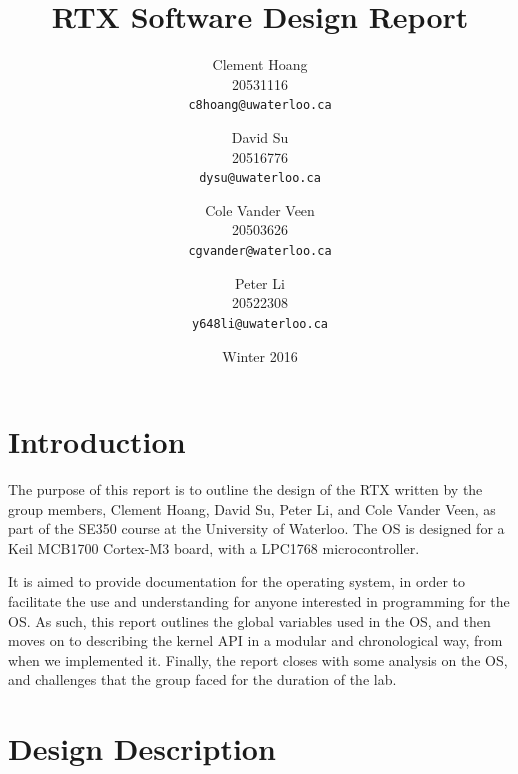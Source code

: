 \documentclass[12pt]{report}
\begin{document}
\title{RTX Software Design Report}

\author{
    Clement Hoang\\
		20531116\\
    \texttt{c8hoang@uwaterloo.ca}
    \and
    David Su\\
		20516776\\
    \texttt{dysu@uwaterloo.ca}
    \and
    Cole Vander Veen\\
		20503626\\
    \texttt{cgvander@waterloo.ca}
    \and
    Peter Li\\
		20522308\\
    \texttt{y648li@uwaterloo.ca}
}

\date{Winter 2016}

\maketitle


\tableofcontents
\listofalgorithms
\listoffigures

\chapter{Introduction}

The purpose of this report is to outline the design of the RTX written by the group members, Clement Hoang, David Su, Peter Li, and Cole Vander Veen, as part of the SE350 course at the University of Waterloo. The OS is designed for a Keil MCB1700 Cortex-M3 board, with a LPC1768 microcontroller.

It is aimed to provide documentation for the operating system, in order to facilitate the use and understanding for anyone interested in programming for the OS. As such, this report outlines the global variables used in the OS, and then moves on to describing the kernel API in a modular and chronological way, from when we implemented it. Finally, the report closes with some analysis on the OS, and challenges that the group faced for the duration of the lab.

\chapter{Design Description}
\end{document}
